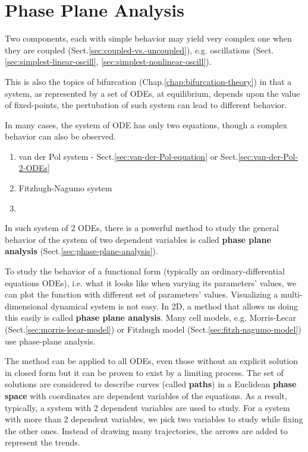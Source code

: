 
\chapter{Phase Plane Analysis}
\label{chap:phase-plane-analysis}

Two components, each with simple behavior may yield very complex one
when they are coupled (Sect.\ref{sec:coupled-vs.-uncoupled}), e.g. oscillations
(Sect.\ref{sec:simplest-linear-oscill}, \ref{sec:simplest-nonlinear-oscill}). 

This is also the topics of bifurcation (Chap.\ref{chap:bifurcation-theory}) in
that a system, as represented by a set of ODEs, at equilibrium, depends upon the
value of fixed-points, the pertubation of such system can lead to different
behavior.

In many cases, the system of ODE has only two equations, though a complex
behavior can also be observed.
\begin{enumerate}
  \item van der Pol system - Sect.\ref{sec:van-der-Pol-equation} or Sect.\ref{sec:van-der-Pol-2-ODEs}
  
  \item Fitzhugh-Nagumo system 

  \item 
\end{enumerate}

In such system of 2 ODEs, there is a powerful method to study the general
behavior of the system of two dependent variables is called {\bf phase plane
analysis} (Sect.\ref{sec:phase-plane-analysis}).

To study the behavior of a functional form (typically an ordinary-differential
equations ODEs), i.e. what it looks like when varying its parameters' values, we
can plot the function with different set of parameters' values. Visualizing a
multi-dimensional dynamical system is not easy. In 2D, a method that allows us
doing this easily is called {\bf phase plane analysis}.  Many cell models, e.g.
Morris-Lecar (Sect.\ref{sec:morris-lecar-model}) or Fitzhugh model
(Sect.\ref{sec:fitzh-nagumo-model}) use phase-plane analysis.

The method can be applied to all ODEs, even those without an explicit solution
in closed form but it can be proven to exist by a limiting process. The set of
solutions are considered to describe curves (called {\bf paths}) in a Euclidean
{\bf phase space} with coordinates are dependent variables of the equations. As
a result, typically, a system with 2 dependent variables are used to study. For
a system with more than 2 dependent variables, we pick two variables to study
while fixing the other ones. Instead of drawing many trajectories, the arrows
are added to represent the trends.

